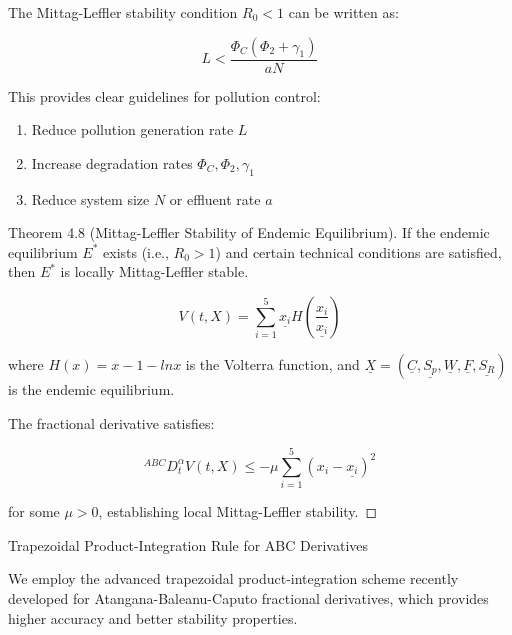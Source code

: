\documentclass[10pt]{NSP1}
\begin{document}
The Mittag-Leffler stability condition \(R_{0} < 1\) can be written as:

\[
L < \frac{\Phi_{C}\left( \Phi_{2} + \gamma_{1} \right)}{aN}
\]

This provides clear guidelines for pollution control:

\begin{enumerate}
  \item Reduce pollution generation rate \(L\)
  \item Increase degradation rates \(\Phi_{C},\Phi_{2},\gamma_{1}\)
  \item Reduce system size \(N\) or effluent rate \(a\)
\end{enumerate}

\par\medskip{}\smallskip

Theorem 4.8 (Mittag-Leffler Stability of Endemic Equilibrium). If the endemic equilibrium \(E^{*}\) exists (i.e., \(R_{0} > 1\)) and certain technical conditions are satisfied, then \(E^{*}\) is locally Mittag-Leffler stable.

\par\medskip{}\smallskip

\[
V(t,X) = \sum_{i = 1}^{5}{}\underline{x_{i}}H\left( \frac{x_{i}}{\underline{x_{i}}} \right)
\]

where \(H(x) = x - 1 - lnx\) is the Volterra function, and \(\underline{X} = \left( \underline{C},\underline{S_{p}},\underline{W},\underline{F},\underline{S_{R}} \right)\) is the endemic equilibrium.

The fractional derivative satisfies:

\[
^{ABC}D_{t}^{\alpha}V(t,X) \leq - \mu\sum_{i = 1}^{5}{}\left( x_{i} - \underline{x_{i}} \right)^{2}
\]

for some \(\mu > 0\), establishing local Mittag-Leffler stability. ◻

\par\medskip{}\smallskip

Trapezoidal Product-Integration Rule for ABC Derivatives

We employ the advanced trapezoidal product-integration scheme recently developed for Atangana-Baleanu-Caputo fractional derivatives, which provides higher accuracy and better stability properties.
\end{document}
